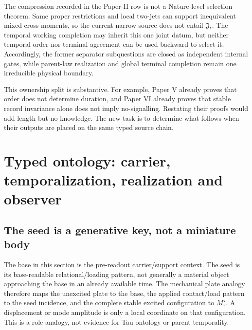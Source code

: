 \documentclass[11pt]{article}
\begin{document}
The compression recorded in the Paper-II row is not a Nature-level selection
theorem.  Same proper restrictions and local two-jets can support inequivalent
mixed cross moments, so the current narrow source does not entail
$\mathfrak J_*$.  The temporal working completion may inherit this one joint
datum, but neither temporal order nor terminal agreement can be used backward
to select it.  Accordingly, the former separator subquestions are closed as
independent internal gates, while parent-law realization and global terminal
completion remain one irreducible physical boundary.
\normalsize

This ownership split is substantive.  For example, Paper V already proves
that order does not determine duration, and Paper VI already proves that
stable record invariance alone does not imply no-signalling.  Restating their
proofs would add length but no knowledge.  The new task is to determine what
follows when their outputs are placed on the same typed source chain.

\section{Typed ontology: carrier, temporalization, realization and observer}

\subsection{The seed is a generative key, not a miniature body}

The base in this section is the pre-readout carrier/support context.  The seed
is its base-readable relational/loading pattern, not generally a material
object approaching the base in an already available time.  The mechanical
plate analogy therefore maps the unexcited plate to the base, the applied
contact/load pattern to the seed incidence, and the complete stable excited
configuration to $M_\tau^\star$.  A displacement or mode amplitude is only a
local coordinate on that configuration.  This is a role analogy, not evidence
for Tau ontology or parent temporality.
\end{document}
